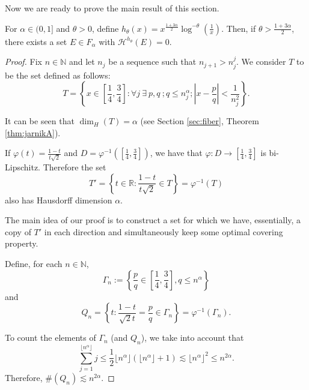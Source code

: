 \documentclass[11pt,a4paper]{amsart}
\begin{document}
Now we are ready to prove the main result of this section.

\begin{theorem}\label{thm:logFalpha}
For $\alpha\in(0,1]$ and $\theta>0$, define
$h_\theta(x)=x^{\frac{1+3\alpha}{2}}\log^{-\theta}(\frac{1}{x})$.
Then, if $\theta>\frac{1+3\alpha}{2}$, there exists a set
$E\in F_\alpha$ with ${\mathcal{H}^{{h_\theta}}}(E)=0$.
\end{theorem}

\begin{proof}
 
Fix $n\in{\mathbb{N}}$ and let $n_j$  be a sequence such that $n_{j+1}>n_j^j$. We consider $T$ to be the set defined as follows:
\begin{equation*}
T=\left\{x\in\left[\frac{1}{4},\frac{3}{4}\right]: \forall j \
\exists\ p,q\ ; q\le n_j^\alpha;
|x-\frac{p}{q}|<\frac{1}{n_j^2}\right\}.
\end{equation*}

It can be seen that $\dim_H(T)=\alpha$ (see Section \ref{sec:fiber}, Theorem \ref{thm:jarnikA}). 

If $\varphi(t)=\frac{1-t}{t\sqrt{2}}$ and $D=\varphi^{-1}\left([\frac{1}{4},\frac{3}{4}]\right)$, we have that $\varphi:D\to [\frac{1}{4},\frac{3}{4}]$ is bi-Lipschitz. Therefore the set
\begin{equation*}
T'=\left\{t\in{\mathbb{R}}:\frac{1-t}{t\sqrt{2}}\in
T\right\}=\varphi^{-1}(T)
\end{equation*}
also has Hausdorff dimension $\alpha$.

The main idea of our proof is to construct a set for which we have,
essentially, a copy of $T'$ in each direction and simultaneously
keep some optimal covering property.

Define, for each $n\in {\mathbb{N}}$,
\begin{equation*}
\Gamma_n:=\left\{\frac{p}{q}\in\left[\frac{1}{4},\frac{3}{4}\right],
q\le n^\alpha\right\}
\end{equation*}
and
\begin{equation*}
Q_n=\left\{ t:\frac{1-t}{\sqrt{2}t}=\frac{p}{q}\in
\Gamma_n\right\}=\varphi^{-1}(\Gamma_n).
\end{equation*}

To count the elements of $\Gamma_n$ (and $Q_n$), we take into
account that
\begin{equation*}
\sum_{j=1}^{\lfloor n^{\alpha}\rfloor}j\le \frac{1}{2} \lfloor
n^{\alpha}\rfloor(\lfloor n^{\alpha}\rfloor+1) \lesssim \lfloor
n^{\alpha}\rfloor^2\le n^{2\alpha}.
\end{equation*}
Therefore, $\#(Q_n)\lesssim n^{2\alpha}$. 


\end{proof}
\end{document}
